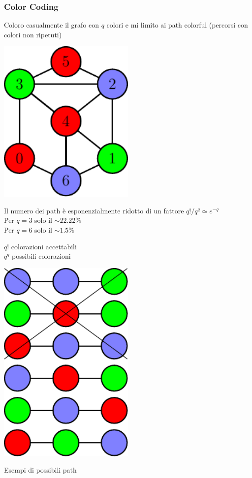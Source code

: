 \begin{frame}
	\frametitle{Color Coding}
	\centering


		\begin{minipage}{.45\textwidth}
			\centering
			Coloro casualmente il grafo con $q$ colori e mi limito ai path colorful 
			(percorsi con colori non ripetuti)
			\medskip
			
			\includegraphics[width=0.5\textwidth]{images/8_cc_graph}
			
			\small
			\medskip
			
			Il numero dei path è esponenzialmente ridotto di un fattore $q! / q^q \simeq e^{-q}$\\
			 
			Per $q=3$ solo il $\sim22.22\%$\\
			Per $q=6$ solo il $\sim1.5\%$\phantom{$22$}
		\end{minipage}\hfill
		\begin{minipage}{.45\textwidth}
			\centering
			$q!$ colorazioni accettabili\\
			$q^q$ possibili colorazioni
			
			\medskip
			
			\includegraphics[width=0.5\textwidth]{images/8_cc_list}
			
			Esempi di possibili path
			\hfill
		\end{minipage}\hfill

\end{frame}

